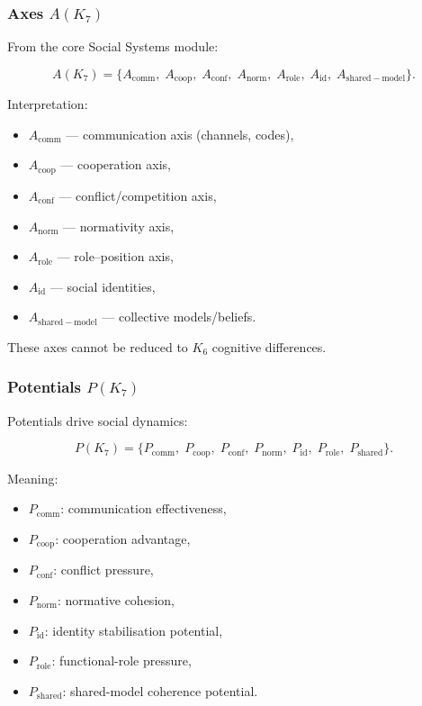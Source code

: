 \subsubsection{Axes \texorpdfstring{$A(K_7)$}{A(K_7)}}

From the core Social Systems module:

\[
A(K_7)=
\{
A_{\mathrm{comm}},\;
A_{\mathrm{coop}},\;
A_{\mathrm{conf}},\;
A_{\mathrm{norm}},\;
A_{\mathrm{role}},\;
A_{\mathrm{id}},\;
A_{\mathrm{shared-model}}
\}.
\]

Interpretation:
\begin{itemize}
    \item $A_{\mathrm{comm}}$ — communication axis (channels, codes),
    \item $A_{\mathrm{coop}}$ — cooperation axis,
    \item $A_{\mathrm{conf}}$ — conflict/competition axis,
    \item $A_{\mathrm{norm}}$ — normativity axis,
    \item $A_{\mathrm{role}}$ — role–position axis,
    \item $A_{\mathrm{id}}$ — social identities,
    \item $A_{\mathrm{shared-model}}$ — collective models/beliefs.
\end{itemize}

These axes cannot be reduced to $K_6$ cognitive differences.

\subsubsection{Potentials \texorpdfstring{$P(K_7)$}{P(K_7)}}

Potentials drive social dynamics:

\[
P(K_7)=
\{
P_{\mathrm{comm}},\;
P_{\mathrm{coop}},\;
P_{\mathrm{conf}},\;
P_{\mathrm{norm}},\;
P_{\mathrm{id}},\;
P_{\mathrm{role}},\;
P_{\mathrm{shared}}
\}.
\]

Meaning:
\begin{itemize}
    \item $P_{\mathrm{comm}}$: communication effectiveness,
    \item $P_{\mathrm{coop}}$: cooperation advantage,
    \item $P_{\mathrm{conf}}$: conflict pressure,
    \item $P_{\mathrm{norm}}$: normative cohesion,
    \item $P_{\mathrm{id}}$: identity stabilisation potential,
    \item $P_{\mathrm{role}}$: functional-role pressure,
    \item $P_{\mathrm{shared}}$: shared-model coherence potential.
\end{itemize}

